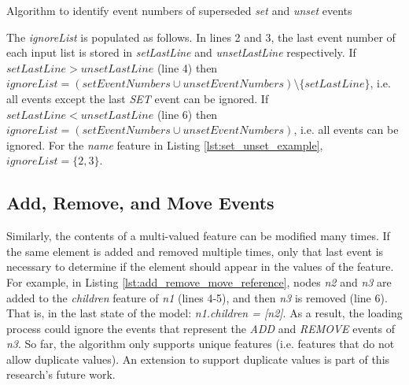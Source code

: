 \documentclass[12pt, a4paper]{report} \usepackage[titletoc]{appendix}
\begin{document}
\begin{algorithm}[H]
	\begin{small}
	\end{small}
	\caption{Algorithm to identify event numbers of superseded \emph{set} and \emph{unset} events}
	\label{alg:set_unset_optimisation}
\end{algorithm}

The \emph{ignoreList} is populated as follows.
In lines 2 and 3, the last event number of each input list is stored in \emph{setLastLine} and \emph{unsetLastLine} respectively. If $setLastLine > unsetLastLine$ (line 4) then $ignoreList = (setEventNumbers \cup unsetEventNumbers) \setminus  \{setLastLine\} $, i.e. all events except the last \emph{SET} event can be ignored. If $setLastLine < unsetLastLine$ (line 6) then $ignoreList = (setEventNumbers \cup unsetEventNumbers)$, i.e. all events can be ignored. For the \emph{name} feature in Listing \ref{lst:set_unset_example}, $ignoreList = \{2, 3\}$.

\subsection{Add, Remove, and Move Events}\label{subsec:add_remove_and_move_operations}
Similarly, the contents of a multi-valued feature can be modified many times. If the same element is added and removed multiple times,  only that last event is necessary to determine if the element should appear in the values of the feature. For example, in Listing \ref{lst:add_remove_move_reference},  nodes \emph{n2} and \emph{n3} are added to the \emph{children} feature of \emph{n1} (lines 4-5), and then \emph{n3} is removed (line 6). That is, in the last state of the model: \emph{n1.children = [n2]}. As a result, the loading process could ignore the events that represent the \emph{ADD} and \emph{REMOVE} events of \emph{n3}. So far, the algorithm only supports unique features (i.e. features that do not allow duplicate values). An extension to support duplicate values is part of this research's future work. 
\end{document}
